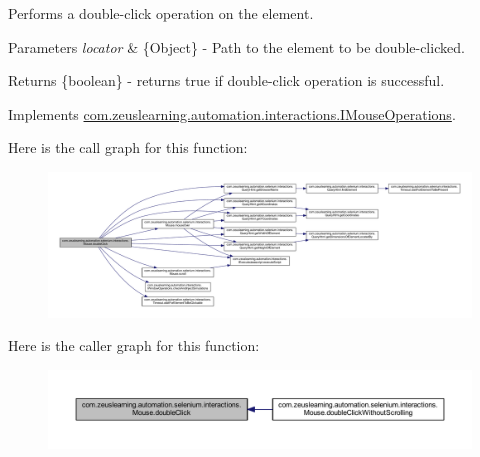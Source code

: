 Performs a double-\/click operation on the element.


\begin{DoxyParams}{Parameters}
{\em locator} & \{Object\} -\/ Path to the element to be double-\/clicked.\\
\hline
\end{DoxyParams}
\begin{DoxyReturn}{Returns}
\{boolean\} -\/ returns {\ttfamily true} if double-\/click operation is successful. 
\end{DoxyReturn}


Implements \hyperlink{interfacecom_1_1zeuslearning_1_1automation_1_1interactions_1_1IMouseOperations_afa934246038ce6ec851e5ec765a1fb5a}{com.\+zeuslearning.\+automation.\+interactions.\+I\+Mouse\+Operations}.

Here is the call graph for this function\+:
\nopagebreak
\begin{figure}[H]
\begin{center}
\leavevmode
\includegraphics[width=350pt]{d0/dfa/classcom_1_1zeuslearning_1_1automation_1_1selenium_1_1interactions_1_1Mouse_a52db5f47eaacbf45fefed4f20be7fbf0_cgraph}
\end{center}
\end{figure}
Here is the caller graph for this function\+:
\nopagebreak
\begin{figure}[H]
\begin{center}
\leavevmode
\includegraphics[width=350pt]{d0/dfa/classcom_1_1zeuslearning_1_1automation_1_1selenium_1_1interactions_1_1Mouse_a52db5f47eaacbf45fefed4f20be7fbf0_icgraph}
\end{center}
\end{figure}
\hypertarget{classcom_1_1zeuslearning_1_1automation_1_1selenium_1_1interactions_1_1Mouse_a4d718e201b6eb171a4016ea46e5f538b}{}\label{classcom_1_1zeuslearning_1_1automation_1_1selenium_1_1interactions_1_1Mouse_a4d718e201b6eb171a4016ea46e5f538b} 
